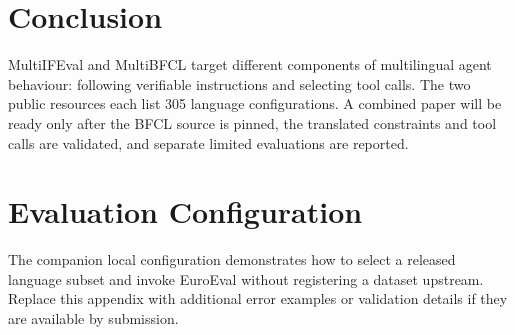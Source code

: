 \documentclass[11pt]{article}
\begin{document}
\section{Conclusion}
\label{sec:conclusion}

MultiIFEval and MultiBFCL target different components of multilingual agent
behaviour: following verifiable instructions and selecting tool calls. The
two public resources each list 305 language configurations. A combined paper
will be ready only after the BFCL source is pinned, the translated constraints
and tool calls are validated, and separate limited evaluations are reported.



\appendix
\section{Evaluation Configuration}
\label{sec:appendix}
The companion local configuration demonstrates how to select a released
language subset and invoke EuroEval without registering a dataset upstream.
Replace this appendix with additional error examples or validation details
if they are available by submission.
\end{document}
